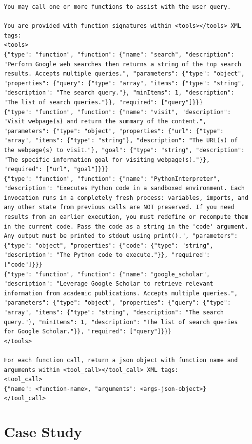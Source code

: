 \documentclass{llmxive}
\begin{document}
\begin{lstlisting}
You may call one or more functions to assist with the user query.

You are provided with function signatures within <tools></tools> XML tags:
<tools>
{"type": "function", "function": {"name": "search", "description": "Perform Google web searches then returns a string of the top search results. Accepts multiple queries.", "parameters": {"type": "object", "properties": {"query": {"type": "array", "items": {"type": "string", "description": "The search query."}, "minItems": 1, "description": "The list of search queries."}}, "required": ["query"]}}}
{"type": "function", "function": {"name": "visit", "description": "Visit webpage(s) and return the summary of the content.", "parameters": {"type": "object", "properties": {"url": {"type": "array", "items": {"type": "string"}, "description": "The URL(s) of the webpage(s) to visit."}, "goal": {"type": "string", "description": "The specific information goal for visiting webpage(s)."}}, "required": ["url", "goal"]}}}
{"type": "function", "function": {"name": "PythonInterpreter", "description": "Executes Python code in a sandboxed environment. Each invocation runs in a completely fresh process: variables, imports, and any other state from previous calls are NOT preserved. If you need results from an earlier execution, you must redefine or recompute them in the current code. Pass the code as a string in the 'code' argument. Any output must be printed to stdout using print().", "parameters": {"type": "object", "properties": {"code": {"type": "string", "description": "The Python code to execute."}}, "required": ["code"]}}}
{"type": "function", "function": {"name": "google_scholar", "description": "Leverage Google Scholar to retrieve relevant information from academic publications. Accepts multiple queries.", "parameters": {"type": "object", "properties": {"query": {"type": "array", "items": {"type": "string", "description": "The search query."}, "minItems": 1, "description": "The list of search queries for Google Scholar."}}, "required": ["query"]}}}
</tools>

For each function call, return a json object with function name and arguments within <tool_call></tool_call> XML tags:
<tool_call>
{"name": <function-name>, "arguments": <args-json-object>}
</tool_call>
\end{lstlisting}



\section{Case Study}
\label{sec:appendix-case}
\end{document}
